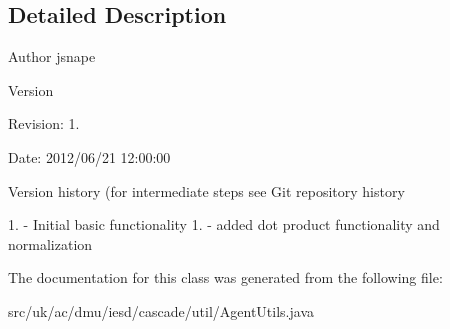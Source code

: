 \subsection{Detailed Description}
\begin{DoxyAuthor}{Author}
jsnape 
\end{DoxyAuthor}
\begin{DoxyVersion}{Version}

\end{DoxyVersion}
\begin{DoxyParagraph}{Revision\-:}
1. 
\end{DoxyParagraph}
\begin{DoxyParagraph}{Date\-:}
2012/06/21 12\-:00\-:00 
\end{DoxyParagraph}


Version history (for intermediate steps see Git repository history

1. -\/ Initial basic functionality 1. -\/ added dot product functionality and normalization 

The documentation for this class was generated from the following file\-:\begin{DoxyCompactItemize}
\item 
src/uk/ac/dmu/iesd/cascade/util/Agent\-Utils.\-java\end{DoxyCompactItemize}
